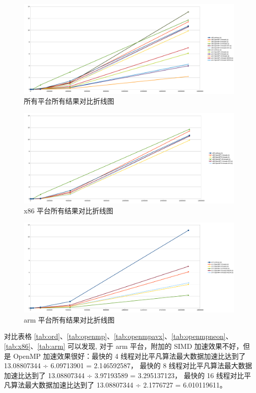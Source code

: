 \documentclass[a4paper]{article}
\begin{document}
\begin{figure}[h]
  \centering
  \includegraphics[width=\textwidth]{all.pdf}
  \caption{所有平台所有结果对比折线图}
  \label{pic:all}
\end{figure}

\begin{figure}[h]
  \centering
  \includegraphics[width=\textwidth]{x86.pdf}
  \caption{x86 平台所有结果对比折线图}
  \label{pic:x86}
\end{figure}

\begin{figure}[h]
  \centering
  \includegraphics[width=\textwidth]{arm.pdf}
  \caption{arm 平台所有结果对比折线图}
  \label{pic:arm}
\end{figure}

对比表格 \ref{tab:ord}、\ref{tab:openmp}、\ref{tab:openmpavx}、\ref{tab:openmpneon}、\ref{tab:x86}、\ref{tab:arm} 可以发现,
对于 arm 平台，附加的 SIMD 加速效果不好，但是 OpenMP 加速效果很好：最快的 4 线程对比平凡算法最大数据加速比达到了 13.08807344 ÷ 6.09713901 = 2.146592587，
最快的 8 线程对比平凡算法最大数据加速比达到了 13.08807344 ÷ 3.97193589 = 3.295137123，
最快的 16 线程对比平凡算法最大数据加速比达到了 13.08807344 ÷ 2.1776727 = 6.010119611。
\end{document}
